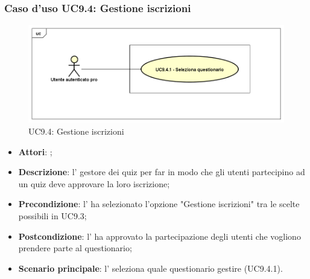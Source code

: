 	 \subsubsection{Caso d'uso UC9.4: Gestione iscrizioni}
	 \label{UC9.4}
	 \begin{figure}[h]
	 	\centering
	 	\includegraphics[scale=0.5,keepaspectratio]{UML/UC9_4.png}
	 	\caption{UC9.4: Gestione iscrizioni}
	 \end{figure}
	 \FloatBarrier
	 \begin{itemize}
	 	\item \textbf{Attori}: \uaupro{};
	 	\item \textbf{Descrizione}: l'\uaupro{} gestore dei quiz per far in modo che gli utenti partecipino ad un quiz deve approvare la loro iscrizione;
	 	\item \textbf{Precondizione}: l'\uaupro{} ha selezionato l'opzione "Gestione iscrizioni" tra le scelte possibili in UC9.3;
	 	\item \textbf{Postcondizione}: l'\uaupro{} ha approvato la partecipazione degli utenti che vogliono prendere parte al questionario;
	 	\item \textbf{Scenario principale}: l'\uaupro{} seleziona quale questionario gestire (UC9.4.1).
	 \end{itemize}
	 
